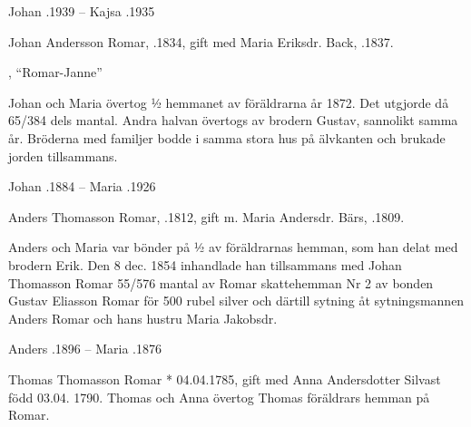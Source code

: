 Johan .1939  --  Kajsa .1935



Johan Andersson Romar, .1834, gift med Maria Eriksdr. Back, .1837.
\begin{jhchildren}
  \item {}
  \item {}, ``Romar-Janne''
  \item {}
\end{jhchildren}
Johan och Maria övertog ½ hemmanet av föräldrarna år 1872. Det utgjorde då 65/384 dels mantal. Andra halvan övertogs av brodern Gustav, sannolikt samma år. Bröderna med familjer bodde i samma stora hus på älvkanten och brukade jorden tillsammans.

Johan .1884  --  Maria .1926


Anders Thomasson Romar, .1812, gift m. Maria Andersdr. Bärs, .1809.
\begin{jhchildren}
  \item {}
  \item {}
  \item {}
  \item {}
  \item {}
  \item {}
  \item {}
  \item {}
\end{jhchildren}
Anders och Maria var bönder på ½ av föräldrarnas hemman, som han delat med brodern Erik. Den 8 dec. 1854 inhandlade han tillsammans med Johan Thomasson Romar 55/576 mantal av Romar skattehemman Nr 2 av bonden Gustav Eliasson Romar för 500 rubel silver och därtill sytning åt sytningsmannen Anders Romar och hans hustru Maria Jakobsdr.

Anders .1896  --  Maria .1876


Thomas Thomasson Romar * 04.04.1785, gift med Anna Andersdotter Silvast född 03.04. 1790.
Thomas och Anna övertog Thomas föräldrars hemman på Romar.
\begin{jhchildren}
  \item {}
  \item {}
\end{jhchildren}

